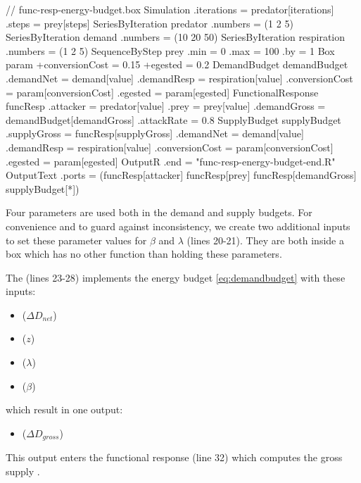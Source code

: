 \lstset{numbers=left}
\begin{boxscript}
// func-resp-energy-budget.box
Simulation {
  .iterations = predator[iterations]
  .steps = prey[steps]
  SeriesByIteration predator {
    .numbers = (1 2 5)
  }
  SeriesByIteration demand {
    .numbers = (10 20 50)
  }
  SeriesByIteration respiration {
    .numbers = (1 2 5)
  }
  SequenceByStep prey {
    .min = 0
    .max = 100
    .by = 1
  }
  Box param {
    +conversionCost = 0.15
    +egested = 0.2
  }
  DemandBudget demandBudget {
    .demandNet = demand[value]
    .demandResp = respiration[value]
    .conversionCost = param[conversionCost]
    .egested = param[egested]
  }
  FunctionalResponse funcResp {
    .attacker = predator[value]
    .prey = prey[value]
    .demandGross = demandBudget[demandGross]
    .attackRate = 0.8
  }
  SupplyBudget supplyBudget {
    .supplyGross = funcResp[supplyGross]
    .demandNet = demand[value]
    .demandResp = respiration[value]
    .conversionCost = param[conversionCost]
    .egested = param[egested]
  }
  OutputR {
    .end = "func-resp-energy-budget-end.R"
    OutputText {
      .ports = (funcResp[attacker] funcResp[prey] 
                funcResp[demandGross] supplyBudget[*])
    }
  }
} \end{boxscript}
\lstset{numbers=none}

Four parameters are used both in the demand and supply budgets. For convenience and to guard against inconsistency, we create two additional inputs to set these parameter values for $\beta$ and $\lambda$ (lines 20-21). They are both inside a  box which has no other function than holding these parameters.

The  (lines 23-28) implements the energy budget \eqref{eq:demandbudget} with these inputs:
\begin{itemize}
\item {} ($\Delta D_{net}$)
\item {} ($z$)
\item {} ($\lambda$)
\item {} ($\beta$)
\end{itemize}

\noindent which result in one output:
\begin{itemize}
\item {} ($\Delta D_{gross}$)
\end{itemize}

This  output enters the functional response (line 32) which computes the gross supply .

